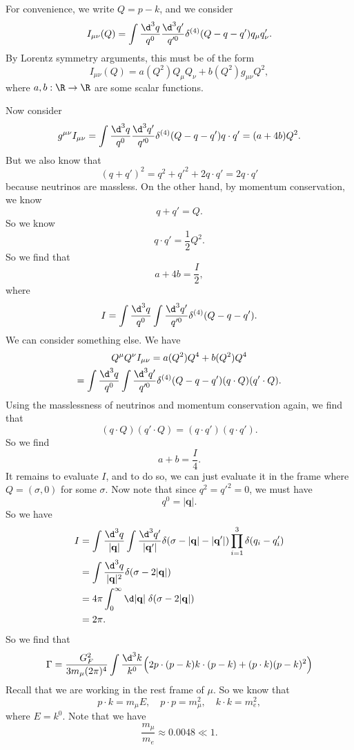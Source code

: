 \documentclass[a4paper]{article}
\begin{document}
For convenience, we write $Q = p - k$, and we consider
\[
  I_{\mu\nu}(Q) = \int \frac{\d^3 q}{q^0} \frac{\d^3 q'}{q'^0} \delta^{(4)}(Q - q - q') q_\mu q'_\nu.
\]
By Lorentz symmetry arguments, this must be of the form
\[
  I_{\mu\nu} (Q) = a(Q^2) Q_\mu Q_\nu + b(Q^2) g_{\mu\nu} Q^2,
\]
where $a, b: \R \to \R$ are some scalar functions.

Now consider
\[
  g^{\mu\nu} I_{\mu\nu} = \int \frac{\d^3 q}{q^0} \frac{\d^3 q'}{q'^0} \delta^{(4)}(Q - q - q') q \cdot q' = (a + 4b) Q^2 .
\]
But we also know that
\[
  (q + q')^2 = q^2 + q'^2 + 2 q \cdot q' = 2 q \cdot q'
\]
because neutrinos are massless. On the other hand, by momentum conservation, we know
\[
  q + q' = Q.
\]
So we know
\[
  q \cdot q' = \frac{1}{2} Q^2.
\]
So we find that
\[
  a + 4b = \frac{I}{2},\tag{$1$}
\]
where
\[
  I = \int \frac{\d^3 q}{q^0} \int \frac{\d^3 q'}{q'^0} \delta^{(4)} (Q - q - q').
\]
We can consider something else. We have
\begin{multline*}
  Q^\mu Q^\nu I_{\mu\nu} = a(Q^2) Q^4 + b(Q^2) Q^4 \\
  = \int \frac{\d^3 q}{q^0} \int \frac{\d^3 q'}{q'^0} \delta^{(4)} (Q - q - q') (q\cdot Q) (q' \cdot Q).
\end{multline*}
Using the masslessness of neutrinos and momentum conservation again, we find that
\[
  (q \cdot Q) (q' \cdot Q) = (q \cdot q') (q \cdot q').
\]
So we find
\[
  a + b = \frac{I}{4}\tag{$2$}.
\]
It remains to evaluate $I$, and to do so, we can just evaluate it in the frame where $Q = (\sigma, 0)$ for some $\sigma$. Now note that since $q^2 = q'^2 = 0$, we must have
\[
  q^0 = |\mathbf{q}|.
\]
So we have
\begin{align*}
  I &= \int \frac{\d^3 q}{|\mathbf{q}|} \int \frac{\d^3 q'}{|\mathbf{q}'|} \delta(\sigma - |\mathbf{q}| - |\mathbf{q}'|) \prod_{i = 1}^3 \delta(q_i - q_i')\\
  &= \int \frac{\d^3 q}{|\mathbf{q}|^2} \delta(\sigma - 2|\mathbf{q}|)\\
  &= 4\pi \int_0^\infty \d |\mathbf{q}|\; \delta(\sigma - 2|\mathbf{q}|)\\
  &= 2\pi.
\end{align*}
So we find that
\[
  \Gamma = \frac{G_F^2}{3 m_\mu (2\pi)^4} \int \frac{\d^3 k}{k^0} \Big(2 p \cdot (p - k) k \cdot (p - k) + (p \cdot k)(p - k)^2\Big)
\]
Recall that we are working in the rest frame of $\mu$. So we know that
\[
  p \cdot k = m_\mu E,\quad p \cdot p = m_\mu^2,\quad k \cdot k = m_e^2,
\]
where $E = k^0$. Note that we have
\[
  \frac{m_\mu}{m_e}\approx 0.0048 \ll 1.
\]
\end{document}
